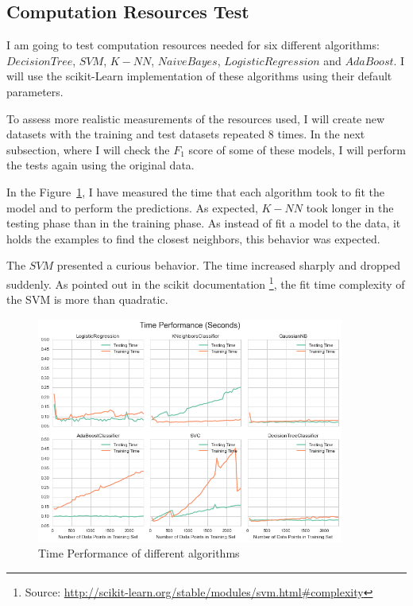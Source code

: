 \documentclass[a4paper]{article}
\begin{document}
\subsection{Computation Resources Test}
I am going to test computation resources needed for six different algorithms: $Decision Tree$, $SVM$, $K-NN$, $Naive Bayes$, $Logistic Regression$ and $AdaBoost$. I will use the scikit-Learn implementation of these algorithms using their default parameters.

To assess more realistic measurements of the resources used, I will create new datasets with the training and test datasets repeated 8 times. In the next subsection, where I will check the $F_1$ score of some of these models, I will perform the tests again using the original data.

In the Figure~\ref{fig:timetest}, I have measured the time that each algorithm took to fit the model and to perform the predictions. As expected, $K-NN$ took longer in the testing phase than in the training phase. As instead of  fit a model to the data, it holds the examples to find the closest neighbors, this behavior was expected. 

The $SVM$ presented a curious behavior. The time increased sharply and dropped suddenly. As pointed out in the scikit documentation \footnote{Source: \url{http://scikit-learn.org/stable/modules/svm.html\#complexity}}, the fit time complexity of the SVM is more than quadratic.

\begin{figure}[ht!]
\centering
\includegraphics[width=0.9\textwidth]{figures/timePerformance.png}
\caption{\label{fig:timetest}Time Performance of different algorithms}
\end{figure}
\end{document}
